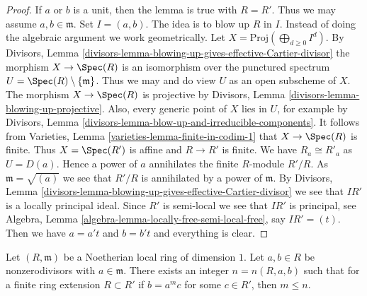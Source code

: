 \begin{proof}
If $a$ or $b$ is a unit, then the lemma is true with $R = R'$.
Thus we may assume $a, b \in \mathfrak m$.
Set $I = (a, b)$. The idea is to blow up $R$ in $I$.
Instead of doing the algebraic argument we work geometrically.
Let $X = \text{Proj}(\bigoplus_{d \geq 0} I^d)$.
By Divisors, Lemma
\ref{divisors-lemma-blowing-up-gives-effective-Cartier-divisor}
the morphism $X \to \Spec(R)$ is an isomorphism over
the punctured spectrum $U = \Spec(R) \setminus \{\mathfrak m\}$.
Thus we may and do view $U$ as an open subscheme of $X$.
The morphism $X \to \Spec(R)$ is projective by
Divisors, Lemma \ref{divisors-lemma-blowing-up-projective}.
Also, every generic point of $X$ lies in $U$, for example
by Divisors, Lemma \ref{divisors-lemma-blow-up-and-irreducible-components}.
It follows from Varieties, Lemma \ref{varieties-lemma-finite-in-codim-1}
that $X \to \Spec(R)$ is finite. Thus $X = \Spec(R')$ is
affine and $R \to R'$ is finite. We have $R_a \cong R'_a$ as $U = D(a)$.
Hence a power of $a$ annihilates the finite $R$-module $R'/R$.
As $\mathfrak m = \sqrt{(a)}$ we see that $R'/R$ is annihilated
by a power of $\mathfrak m$. By
Divisors, Lemma \ref{divisors-lemma-blowing-up-gives-effective-Cartier-divisor}
we see that $IR'$ is a locally principal ideal.
Since $R'$ is semi-local we see that $IR'$ is principal,
see Algebra, Lemma \ref{algebra-lemma-locally-free-semi-local-free},
say $IR' = (t)$. Then we have $a = a't$ and $b = b't$ and everything is
clear.
\end{proof}

\begin{lemma}
\label{lemma-not-infinitely-divisible}
Let $(R, \mathfrak m)$ be a Noetherian local ring of dimension $1$.
Let $a, b \in R$ be nonzerodivisors with $a \in \mathfrak m$.
There exists an integer $n = n(R, a, b)$ such that for a finite ring
extension $R \subset R'$ if $b = a^m c$ for some $c \in R'$, then $m \leq n$.
\end{lemma}

